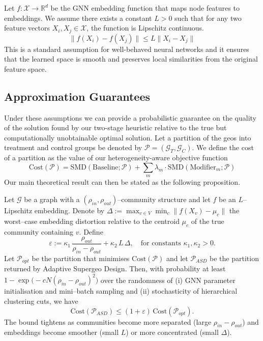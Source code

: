 \documentclass[final,3p,fleqn, 10pt]{elsarticle}
\begin{document}
    \begin{assumption}
    Let $f: \mathcal{X} \to \mathbb{R}^d$ be the GNN embedding function that maps node features to embeddings. We assume there exists a constant $L > 0$ such that for any two feature vectors $X_i, X_j \in \mathcal{X}$, the function is Lipschitz continuous.
    $$ \|f(X_i) - f(X_j)\| \le L \|X_i - X_j\| $$
    This is a standard assumption for well-behaved neural networks and it ensures that the learned space is smooth and preserves local similarities from the original feature space.
    \end{assumption}

    \subsection{Approximation Guarantees}
    Under these assumptions we can provide a probabilistic guarantee on the quality of the solution found by our two-stage heuristic relative to the true but computationally unobtainable optimal solution. Let a partition of the geos into treatment and control groups be denoted by $\mathcal{P} = (\mathcal{G}_T, \mathcal{G}_C)$. We define the cost of a partition as the value of our heterogeneity-aware objective function
    $$ \text{Cost}(\mathcal{P}) = \text{SMD}(\text{Baseline}; \mathcal{P}) + \sum_{m} \lambda_m \cdot \text{SMD}(\text{Modifier}_m; \mathcal{P}) $$
    Our main theoretical result can then be stated as the following proposition.

    \begin{proposition}\label{prop:approx}
    Let $\mathcal{G}$ be a graph with a $(\rho_{in},\rho_{out})$–community structure and let $f$ be an $L$–Lipschitz embedding. Denote by $\Delta:=\max_{v\in V}\min_{c} \|f(X_v)-\mu_{c}\|$ the worst–case embedding distortion relative to the centroid $\mu_{c}$ of the true community containing $v$. Define
    \[
        \varepsilon := \kappa_1\,\frac{\rho_{out}}{\rho_{in}-\rho_{out}} + \kappa_2\,L\,\Delta, \quad \text{for constants }\kappa_1,\kappa_2>0.
    \]
    Let $\mathcal{P}_{opt}$ be the partition that minimises $\text{Cost}(\mathcal{P})$ and let $\mathcal{P}_{ASD}$ be the partition returned by Adaptive Supergeo Design. Then, with probability at least $1-\exp\bigl(-cN(\rho_{in}-\rho_{out})^{2}\bigr)$ over the randomness of (i) GNN parameter initialisation and mini–batch sampling and (ii) stochasticity of hierarchical clustering cuts, we have
    $$
        \text{Cost}(\mathcal{P}_{ASD}) \le (1+\varepsilon)\,\text{Cost}(\mathcal{P}_{opt}).
    $$
    The bound tightens as communities become more separated (large $\rho_{in}-\rho_{out}$) and embeddings become smoother (small $L$) or more concentrated (small $\Delta$).
    \end{proposition}
\end{document}
